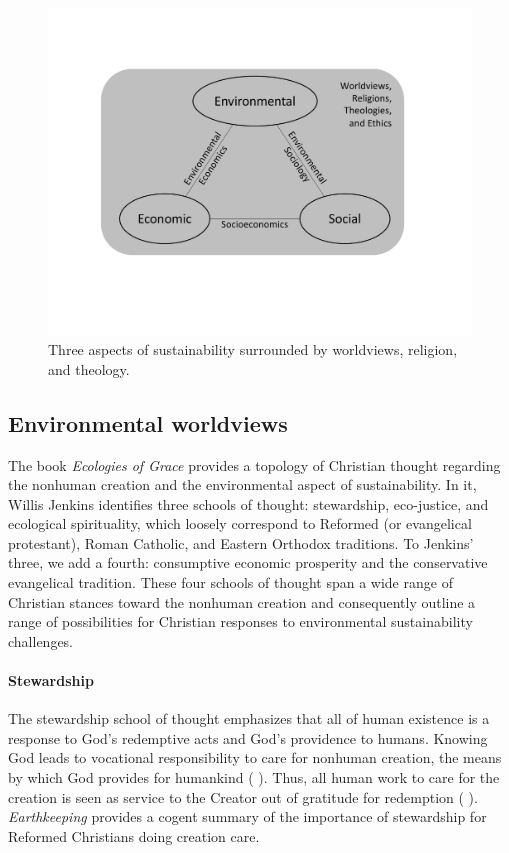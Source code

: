 \documentclass[12pt]{article}
\begin{document}
\begin{figure}
\centering
\includegraphics[width=0.75\linewidth]{figure_other/TriangleDiagramWithTheology.pdf}
\caption{Three aspects of sustainability surrounded by worldviews, religion, and theology.}
\label{fig:3_sustain_with_worldviews}
\end{figure}


\subsection{Environmental worldviews}
\label{sec:environmental}

The book \emph{Ecologies of Grace} \autocite{Jenkins:2008}
provides a topology of Christian thought regarding the 
nonhuman creation and the
environmental aspect of sustainability.
In it, Willis Jenkins identifies three schools of thought:
stewardship, 
eco-justice, and 
ecological spirituality,
which loosely correspond to 
Reformed (or evangelical protestant), 
Roman Catholic, and 
Eastern Orthodox 
traditions.
To Jenkins' three, we add a fourth:
consumptive economic prosperity and
the conservative evangelical tradition. 
These four schools of thought 
span a wide range of Christian stances toward the nonhuman creation
and 
consequently outline a range of possibilities 
for Christian responses to environmental sustainability challenges.

\paragraph{Stewardship} 
\label{sec:stewardship}

The stewardship school of thought 
emphasizes that all of human existence
is a response to God's redemptive acts
and God's providence to humans.
Knowing God leads to vocational responsibility 
to care for nonhuman creation,
the means by which God provides for humankind 
(\textcite{Jenkins:2008} \textcite[19]{Jenkins:2008}). 
Thus, all human work to care for the creation 
is seen as service to the Creator
out of gratitude for redemption (\textcite{Jenkins:2008} \textcite[77]{Jenkins:2008}).
\emph{Earthkeeping} \autocite{Wilkenson:1980aa} provides a cogent summary
of the importance of stewardship for Reformed Christians doing creation care.
\end{document}

